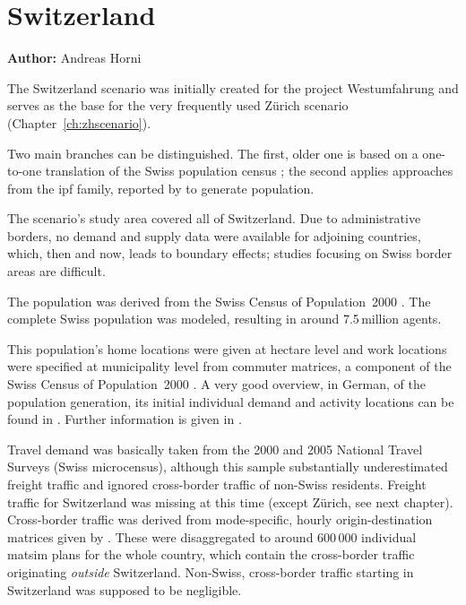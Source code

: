 \chapter{Switzerland}
\label{ch:switzerland-scenario}
\hfill \textbf{Author:} Andreas Horni


The Switzerland scenario was initially created for the project Westumfahrung \citep[][]{BalmerEtAl_ResRep_bdktzrh_2009} and serves as the base for the very frequently used Zürich scenario (Chapter~\ref{ch:zhscenario}). 

Two main branches can be distinguished. The first, older one is based on a one-to-one translation of the Swiss population census \citep[][]{BfS_VZ_2000}; the second applies approaches from the \gls{ipf} family, reported by \citet[][]{MuellerKAxhausen_TechRep_IVT_2013, Mueller_unpub_LATSIS_2012, Mueller_unpub_ETC_2011, Mueller_unpub_STRC_2011, Mueller_unpub_IATBR_2012} to generate population.

The scenario's study area covered all of Switzerland. Due to administrative borders, no demand and supply data were available for adjoining countries, which, then and now, leads to boundary effects; studies focusing on Swiss border areas are difficult.

The population was derived from the Swiss Census of Population~2000 \citep[][]{BfS_VZ_2000}. The complete Swiss population was modeled, resulting in around 7.5\,million agents. 

This population's home locations were given at hectare level and work locations were specified at municipality level from commuter matrices, a component of the Swiss Census of Population~2000 \citep[][p.35]{BalmerEtAl_ResRep_bdktzrh_2009}. A very good overview, in German, of the population generation, its initial individual demand and activity locations can be found in \citet{MeisterEtAl_SVT_2009}. Further information is given in \citet[][]{CiariEtAl_STRC_2008, MeisterEtAl_WCTRS_2010, BalmerEtAl_ResRep_bdktzrh_2009, BalmerEtAl_ResRep_datapuls_2010, BalmerEtAl_HEUREKA_2008}.

Travel demand was basically taken from the 2000 and 2005 National Travel Surveys \citep[][]{BfS-MZ2005_manual_2006} (Swiss microcensus), although this sample substantially underestimated freight traffic and ignored cross-border traffic of non-Swiss residents. Freight traffic for Switzerland was missing at this time (except Zürich, see next chapter). Cross-border traffic was derived from mode-specific, hourly origin-destination matrices given by \citet[][]{VrticEtAl_ResRep_UVEK_2007}. These were disaggregated to around 600\,000 individual \gls{matsim} plans for the whole country, which contain the cross-border traffic originating \emph{outside} Switzerland. Non-Swiss, cross-border traffic starting in Switzerland was supposed to be negligible. 

